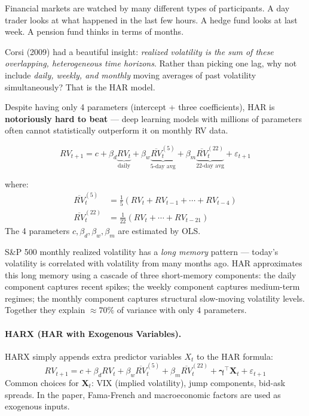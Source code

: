 \documentclass[11pt]{article}
\newcommand{\concept}[2]{%
  \begin{tcolorbox}[conceptbox, title={#1}]
  #2
  \end{tcolorbox}
}
\newcommand{\mathblock}[2]{%
  \begin{tcolorbox}[mathbox, title={Math: #1}]
  #2
  \end{tcolorbox}
}
\newcommand{\example}[2]{%
  \begin{tcolorbox}[examplebox, title={Concrete Example: #1}]
  #2
  \end{tcolorbox}
}
\begin{document}
\concept{The Key Idea --- Multiple Horizons of Persistence}{
Financial markets are watched by many different types of participants. A
day trader looks at what happened in the last few hours. A hedge fund looks
at last week. A pension fund thinks in terms of months.

Corsi (2009) had a beautiful insight: \emph{realized volatility is the sum
of these overlapping, heterogeneous time horizons}. Rather than picking one
lag, why not include \emph{daily, weekly, and monthly} moving averages of
past volatility simultaneously? That is the HAR model.

Despite having only 4 parameters (intercept + three coefficients), HAR is
\textbf{notoriously hard to beat} --- deep learning models with millions
of parameters often cannot statistically outperform it on monthly RV data.
}

\mathblock{HAR Formula}{
\[
  RV_{t+1} = c + \beta_d \underbrace{RV_t}_{\text{daily}}
               + \beta_w \underbrace{\overline{RV}^{(5)}_t}_{\text{5-day avg}}
               + \beta_m \underbrace{\overline{RV}^{(22)}_t}_{\text{22-day avg}}
               + \varepsilon_{t+1}
\]

where:
\begin{align*}
  \overline{RV}^{(5)}_t  &= \tfrac{1}{5}(RV_t + RV_{t-1} + \cdots + RV_{t-4}) \\
  \overline{RV}^{(22)}_t &= \tfrac{1}{22}(RV_t + \cdots + RV_{t-21})
\end{align*}
The 4 parameters $c, \beta_d, \beta_w, \beta_m$ are estimated by OLS.
}

\example{Why HAR Wins on Monthly Data}{
S\&P 500 monthly realized volatility has a \emph{long memory} pattern ---
today's volatility is correlated with volatility from many months ago.
HAR approximates this long memory using a cascade of three short-memory
components: the daily component captures recent spikes; the weekly component
captures medium-term regimes; the monthly component captures structural
slow-moving volatility levels. Together they explain $\approx 70\%$ of
variance with only 4 parameters.
}

\paragraph{HARX (HAR with Exogenous Variables).}
HARX simply appends extra predictor variables $X_t$ to the HAR formula:
\[
  RV_{t+1} = c + \beta_d RV_t + \beta_w \overline{RV}^{(5)}_t
               + \beta_m \overline{RV}^{(22)}_t
               + \boldsymbol{\gamma}^\top \mathbf{X}_t + \varepsilon_{t+1}
\]
Common choices for $\mathbf{X}_t$: VIX (implied volatility), jump components,
bid-ask spreads. In the paper, Fama-French and macroeconomic factors are used
as exogenous inputs.
\end{document}
